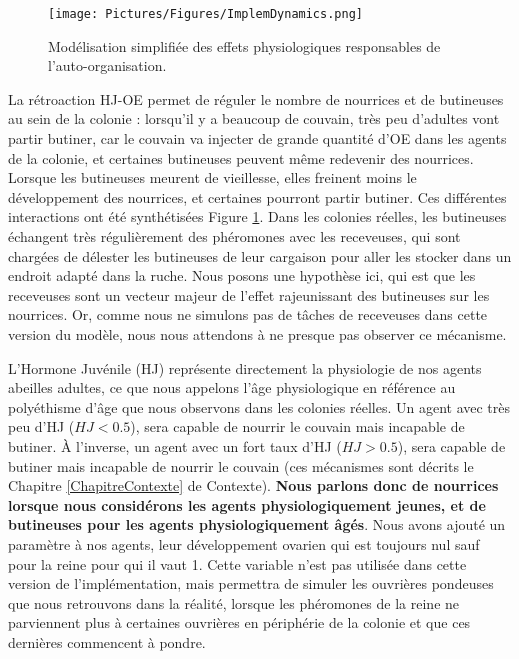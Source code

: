 			
			\begin{figure}
			\centering
			\texttt{[image: Pictures/Figures/ImplemDynamics.png]}
			\caption[Notre modélisation de la physiologie de l'abeille adulte.]{Modélisation simplifiée des effets physiologiques responsables de l'auto-organisation.}
			\label{HJEODynamics}
			\end{figure}
		
		La rétroaction HJ-OE permet de réguler le nombre de nourrices et de butineuses au sein de la colonie : lorsqu'il y a beaucoup de couvain, très peu d'adultes vont partir butiner, car le couvain va injecter de grande quantité d'OE dans les agents de la colonie, et certaines butineuses peuvent même redevenir des nourrices. Lorsque les butineuses meurent de vieillesse, elles freinent moins le développement des nourrices, et certaines pourront partir butiner. Ces différentes interactions ont été synthétisées Figure \ref{HJEODynamics}. Dans les colonies réelles, les butineuses échangent très régulièrement des phéromones avec les receveuses, qui sont chargées de délester les butineuses de leur cargaison pour aller les stocker dans un endroit adapté dans la ruche. Nous posons une hypothèse ici, qui est que les receveuses sont un vecteur majeur de l'effet rajeunissant des butineuses sur les nourrices. Or, comme nous ne simulons pas de tâches de receveuses dans cette version du modèle, nous nous attendons à ne presque pas observer ce mécanisme.
		
		L'Hormone Juvénile (HJ) représente directement la physiologie de nos agents abeilles adultes, ce que nous appelons l'âge physiologique en référence au polyéthisme d'âge que nous observons dans les colonies réelles. Un agent avec très peu d'HJ ($HJ < 0.5$), sera capable de nourrir le couvain mais incapable de butiner. À l'inverse, un agent avec un fort taux d'HJ ($HJ > 0.5$), sera capable de butiner mais incapable de nourrir le couvain (ces mécanismes sont décrits le Chapitre \ref{ChapitreContexte} de Contexte). \textbf{Nous parlons donc de nourrices lorsque nous considérons les agents physiologiquement jeunes, et de butineuses pour les agents physiologiquement âgés}. Nous avons ajouté un paramètre à nos agents, leur développement ovarien qui est toujours nul sauf pour la reine pour qui il vaut 1. Cette variable n'est pas utilisée dans cette version de l'implémentation, mais permettra de simuler les ouvrières pondeuses que nous retrouvons dans la réalité, lorsque les phéromones de la reine ne parviennent plus à certaines ouvrières en périphérie de la colonie et que ces dernières commencent à pondre.
		
